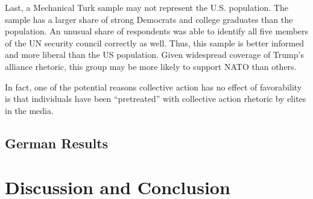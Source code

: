 \documentclass[12pt]{article}
\begin{document}
Last, a Mechanical Turk sample may not represent the U.S. population. 
The sample has a larger share of strong Democrats and college graduates than the population. 
An unusual share of respondents was able to identify all five members of the UN security council correctly as well. 
Thus, this sample is better informed and more liberal than the US population.
Given widespread coverage of Trump's alliance rhetoric, this group may be more likely to support NATO than others. 


In fact, one of the potential reasons collective action has no effect of favorability is that individuals have been ``pretreated'' with collective action rhetoric by elites in the media. 

\subsection{German Results} 



\section{Discussion and Conclusion} 



\newpage

\singlespace
 
 
\end{document}
